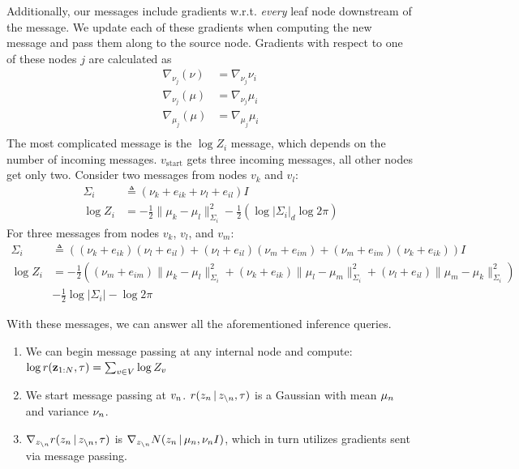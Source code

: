 Additionally, our messages include gradients w.r.t. \emph{every} leaf node
downstream of the message.
We update each of these gradients when computing the new message
and pass them along to the source node.
Gradients with respect to one of these nodes $j$ are calculated as
\begin{equation}
\begin{split}
    \nabla_{\nu_j}(\nu) &= \nabla_{\nu_j} \nu_i\\
    \nabla_{\nu_j}(\mu) &= \nabla_{\nu_j} \mu_i\\
    \nabla_{\mu_j}(\mu) &= \nabla_{\mu_j} \mu_i\\
\end{split}
\end{equation}
The most complicated message is the $\log Z_i$ message, which depends
on the number of incoming messages. $v_{\text{start}}$ gets
three incoming messages,
all other nodes get only two. Consider
two messages from nodes $v_k$ and $v_l$:
\begin{equation}
\begin{split}
    \Sigma_i &\triangleq (\nu_k + e_{ik} + \nu_l + e_{il})I \\
    \log Z_i &= -\frac{1}{2}\|\mu_k - \mu_l\|^2_{\Sigma_i} - \frac{1}{2}\left(\log|\Sigma_i| _ d\log2\pi\right)
\end{split}
\end{equation}
For three messages from nodes
$v_k$, $v_l$, and $v_m$:
\begin{equation}
\begin{split}
    \Sigma_i &\triangleq \left((\nu_k + e_{ik})(\nu_l + e_{il}) + (\nu_l + e_{il})(\nu_m + e_{im}) + (\nu_m + e_{im})(\nu_k + e_{ik})\right)I \\
    \log Z_i &= -\frac{1}{2}\left((\nu_m + e_{im})\|\mu_k - \mu_l\|^2_{\Sigma_i} + (\nu_k + e_{ik})\|\mu_l - \mu_m\|^2_{\Sigma_i} + (\nu_l + e_{il})\|\mu_m - \mu_k\|^2_{\Sigma_i}\right)  \\
             &- \frac{1}{2}\log|\Sigma_i| - \log2\pi
\end{split}
\end{equation}

With these messages, we can answer all the aforementioned inference queries.
\begin{enumerate}
    \item We can begin message passing at any internal node and compute: $\log r(\mathbf{z}_{1:N}, \tau) = \sum_{v \in V} \log Z_v$
    \item We start message passing at $v_n$. $r(z_n \,|\, z_{\backslash n}, \tau)$ is a Gaussian with mean $\mu_n$ and variance $\nu_n$.
    \item $\nabla_{z_{\backslash n}} r(z_n \,|\, z_{\backslash n}, \tau)$ is $\nabla_{z_{\backslash n}} N(z_n \,|\, \mu_n, \nu_n I)$,
    which in turn utilizes gradients sent via message passing.
\end{enumerate}

